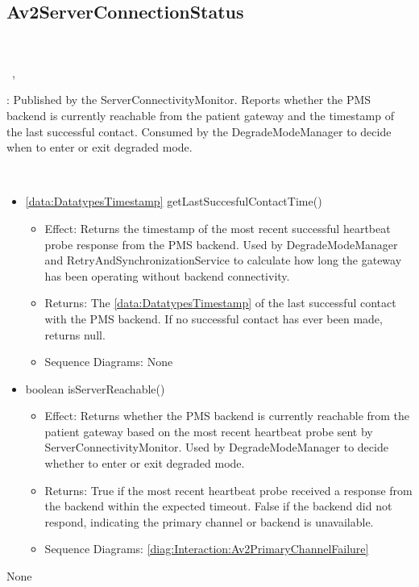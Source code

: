   \subsection{Av2ServerConnectionStatus}\label{int:InterfacesAv2ServerConnectionStatus}
    \begin{description}
      \item[Provided by:] \iconcomponent{}~
      \item[Required by:] \iconcomponent{}~, \iconcomponent{}~ 
           \item[Description]: Published by the ServerConnectivityMonitor. Reports whether the PMS backend is currently reachable from the patient gateway and the timestamp of the last successful contact. Consumed by the DegradeModeManager to decide when to enter or exit degraded mode.
      \item[Operations:] ~
    \begin{itemize}[noitemsep,nolistsep,leftmargin=-.25cm]
      \item \textsf{\ref{data:DatatypesTimestamp} getLastSuccesfulContactTime()}
        \begin{itemize}[noitemsep,nolistsep]
           \item Effect: Returns the timestamp of the most recent successful heartbeat probe response from the PMS backend. Used by DegradeModeManager and RetryAndSynchronizationService to calculate how long the gateway has been operating without backend connectivity. 
           \item Returns: The \ref{data:DatatypesTimestamp} of the last successful contact with the PMS backend. If no successful contact has ever been made, returns null.
           \item Sequence Diagrams: None
        \end{itemize}
      \item \textsf{boolean isServerReachable()}
        \begin{itemize}[noitemsep,nolistsep]
           \item Effect: Returns whether the PMS backend is currently reachable from the patient gateway based on the most recent heartbeat probe sent by ServerConnectivityMonitor. Used by DegradeModeManager to decide whether to enter or exit degraded mode. 
           \item Returns: True if the most recent heartbeat probe received a response from the backend within the expected timeout. False if the backend did not respond, indicating the primary channel or backend is unavailable.
           \item Sequence Diagrams: \cref{diag:Interaction:Av2PrimaryChannelFailure}
        \end{itemize}
    \end{itemize}
      \item[Diagrams:] None
    \end{description}

